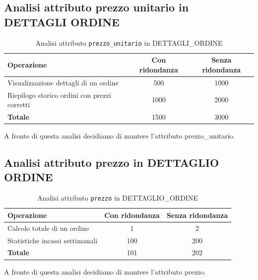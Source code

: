 \documentclass[a4paper,12pt]{report}
\begin{document}
\subsection{Analisi attributo prezzo unitario in DETTAGLI ORDINE}

\begin{table}[H]
	\centering
	\begin{tabular}{|l|c|c|}
		\hline
		\textbf{Operazione}                          & \textbf{Con ridondanza} & \textbf{Senza ridondanza} \\
		\hline
		Visualizzazione dettagli di un ordine        & 500                     & 1000                      \\
		Riepilogo storico ordini con prezzi corretti & 1000                    & 2000                      \\
		\hline
		\textbf{Totale}                              & 1500                    & 3000                      \\
		\hline
	\end{tabular}
	\caption{Analisi attributo \texttt{prezzo\_unitario} in DETTAGLI\_ORDINE}
\end{table}

A fronte di questa analisi decidiamo di mantere l'attributo prezzo\_unitario.

\subsection{Analisi attributo prezzo in DETTAGLIO ORDINE}

\begin{table}[H]
	\centering
	\begin{tabular}{|l|c|c|}
		\hline
		\textbf{Operazione}             & \textbf{Con ridondanza} & \textbf{Senza ridondanza} \\
		\hline
		Calcolo totale di un ordine     & 1                       & 2                         \\
		Statistiche incassi settimanali & 100                     & 200                       \\
		\hline
		\textbf{Totale}                 & 101                     & 202                       \\
		\hline
	\end{tabular}
	\caption{Analisi attributo \texttt{prezzo} in DETTAGLIO\_ORDINE}
\end{table}

A fronte di questa analisi decidiamo di mantere l'attributo prezzo.
\end{document}
